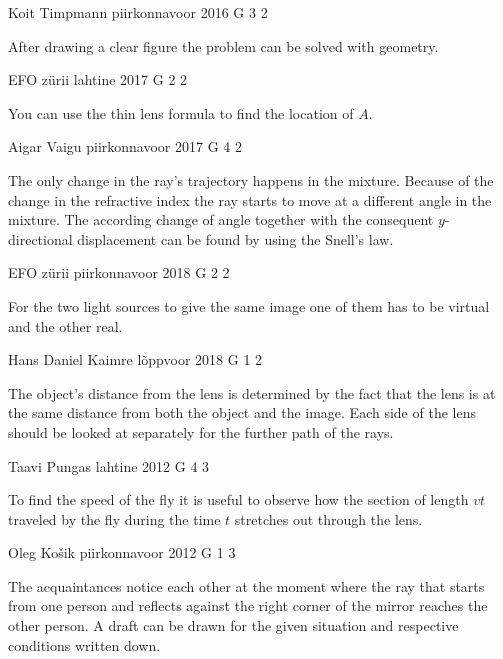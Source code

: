 \documentclass[11pt]{article}
\begin{document}
{Koit Timpmann} %
{piirkonnavoor} %
{2016} %
{G 3} %
{2} %
{

\ifEngHint
After drawing a clear figure the problem can be solved with geometry.
\fi
}

{EFO zürii} %
{lahtine} %
{2017} %
{G 2} %
{2} %
{

\ifEngHint
You can use the thin lens formula to find the location of $A$.
\fi
}

{Aigar Vaigu} %
{piirkonnavoor} %
{2017} %
{G 4} %
{2} %
{

\ifEngHint
The only change in the ray’s trajectory happens in the mixture. Because of the change in the refractive index the ray starts to move at a different angle in the mixture. The according change of angle together with the consequent $y$-directional displacement can be found by using the Snell's law.
\fi
}

{EFO zürii} %
{piirkonnavoor} %
{2018} %
{G 2} %
{2} %
{

\ifEngHint
For the two light sources to give the same image one of them has to be virtual and the other real.
\fi
}

{Hans Daniel Kaimre} %
{lõppvoor} %
{2018} %
{G 1} %
{2} %
{

\ifEngHint
The object's distance from the lens is determined by the fact that the lens is at the same distance from both the object and the image. Each side of the lens should be looked at separately for the further path of the rays.
\fi
}

{Taavi Pungas} %
{lahtine} %
{2012} %
{G 4} %
{3} %
{

\ifEngHint
To find the speed of the fly it is useful to observe how the section of length $vt$ traveled by the fly during the time $t$ stretches out through the lens.
\fi
}

{Oleg Košik} %
{piirkonnavoor} %
{2012} %
{G 1} %
{3} %
{

\ifEngHint
The acquaintances notice each other at the moment where the ray that starts from one person and reflects against the right corner of the mirror reaches the other person. A draft can be drawn for the given situation and respective conditions written down.
\fi
}
\end{document}
